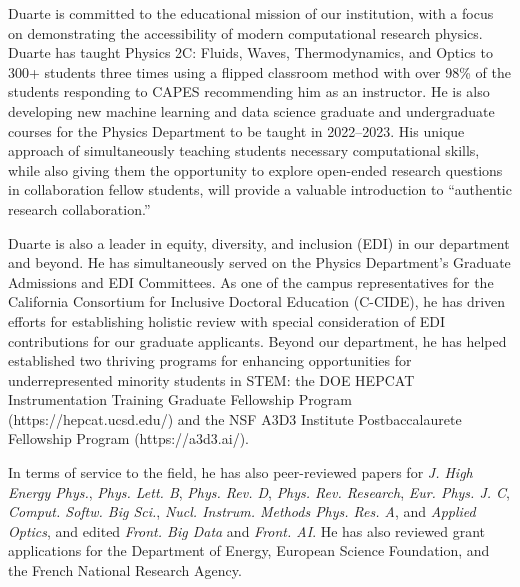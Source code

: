 \documentclass[11pt]{article}
\begin{document}
Duarte is committed to the educational mission of our institution, with a focus on demonstrating the accessibility of modern computational research physics.
Duarte has taught Physics 2C: Fluids, Waves, Thermodynamics, and Optics to 300+ students three times using a flipped classroom method with over 98\% of the students responding to CAPES recommending him as an instructor.
He is also developing new machine learning and data science graduate and undergraduate courses for the Physics Department to be taught in 2022--2023.
His unique approach of simultaneously teaching students necessary computational skills, while also giving them the opportunity to explore open-ended research questions in collaboration fellow students, will provide a valuable introduction to ``authentic research collaboration.''

Duarte is also a leader in equity, diversity, and inclusion (EDI) in our department and beyond.
He has simultaneously served on the Physics Department's Graduate Admissions and EDI Committees.
As one of the campus representatives for the California Consortium for Inclusive Doctoral Education (C-CIDE), he has driven efforts for establishing holistic review with special consideration of EDI contributions for our graduate applicants.
Beyond our department, he has helped established two thriving programs for enhancing opportunities for underrepresented minority students in STEM: the DOE HEPCAT Instrumentation Training Graduate Fellowship Program (https://hepcat.ucsd.edu/) and the NSF A3D3 Institute Postbaccalaurete Fellowship Program (https://a3d3.ai/).

In terms of service to the field, he has also peer-reviewed papers for \emph{J. High Energy Phys.}, \emph{Phys. Lett. B}, \emph{Phys. Rev. D}, \emph{Phys. Rev. Research}, \emph{Eur. Phys. J. C}, \emph{Comput. Softw. Big Sci.}, \emph{Nucl. Instrum. Methods Phys. Res. A}, and \emph{Applied Optics}, and edited \emph{Front. Big Data} and \emph{Front. AI}.
He has also reviewed grant applications for the Department of Energy, European Science Foundation, and the French National Research Agency.
\end{document}
